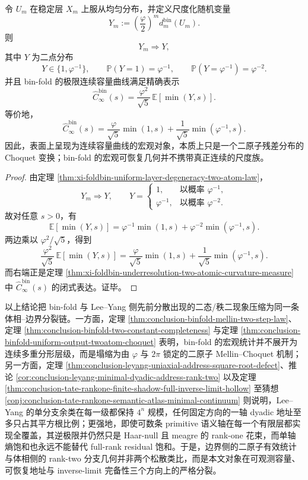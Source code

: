 \begin{theorem}\label{thm:conclusion-binfold-uniform-output-twoatom-choquet}
令 \(U_m\) 在稳定层 \(X_m\) 上服从均匀分布，并定义尺度化随机变量
\[
Y_m:=
\left(\frac{\varphi}{2}\right)^m d_m^{\mathrm{bin}}(U_m).
\]
则
\[
Y_m\Rightarrow Y,
\]
其中 \(Y\) 为二点分布
\[
Y\in\{1,\varphi^{-1}\},
\qquad
\mathbb P(Y=1)=\varphi^{-1},
\qquad
\mathbb P(Y=\varphi^{-1})=\varphi^{-2}.
\]
并且 bin-fold 的极限连续容量曲线满足精确表示
\[
\widehat C_\infty^{\mathrm{bin}}(s)
=
\frac{\varphi^2}{\sqrt5}\,\mathbb E[\min(Y,s)].
\]
等价地，
\[
\widehat C_\infty^{\mathrm{bin}}(s)
=
\frac{\varphi}{\sqrt5}\min(1,s)
+
\frac{1}{\sqrt5}\min(\varphi^{-1},s).
\]
因此，表面上呈现为连续容量曲线的宏观对象，本质上只是一个二原子残差分布的 Choquet 变换；bin-fold 的宏观可恢复几何并不携带真正连续的尺度族。
\end{theorem}
\begin{proof}
由定理 \ref{thm:xi-foldbin-uniform-layer-degeneracy-two-atom-law}，
\[
Y_m\Rightarrow Y,
\qquad
Y=
\begin{cases}
1,& \text{以概率 }\varphi^{-1},\\[4pt]
\varphi^{-1},& \text{以概率 }\varphi^{-2}.
\end{cases}
\]
故对任意 \(s>0\)，有
\[
\mathbb E[\min(Y,s)]
=
\varphi^{-1}\min(1,s)
+
\varphi^{-2}\min(\varphi^{-1},s).
\]
两边乘以 \(\varphi^2/\sqrt5\)，得到
\[
\frac{\varphi^2}{\sqrt5}\,\mathbb E[\min(Y,s)]
=
\frac{\varphi}{\sqrt5}\min(1,s)
+
\frac{1}{\sqrt5}\min(\varphi^{-1},s).
\]
而右端正是定理 \ref{thm:xi-foldbin-underresolution-two-atomic-curvature-measure} 中
\(
\widehat C_\infty^{\mathrm{bin}}(s)
\)
的闭式表达。证毕。
\end{proof}



\noindent
以上结论把 bin-fold 与 Lee--Yang 侧先前分散出现的二态/秩二现象压缩为同一条体相--边界分裂链。一方面，定理 \ref{thm:conclusion-binfold-mellin-two-step-law}、定理 \ref{thm:conclusion-binfold-two-constant-completeness} 与定理 \ref{thm:conclusion-binfold-uniform-output-twoatom-choquet} 表明，bin-fold 的宏观统计并不展开为连续多重分形层级，而是塌缩为由 \(\varphi\) 与 \(2\pi\) 锁定的二原子 Mellin--Choquet 机制；另一方面，定理 \ref{thm:conclusion-leyang-uniaxial-address-square-root-defect}、推论 \ref{cor:conclusion-leyang-minimal-dyadic-address-rank-two} 以及定理 \ref{thm:conclusion-tate-rankone-finite-shadow-full-inverse-limit-hollow} 至猜想 \ref{conj:conclusion-tate-rankone-semantic-atlas-minimal-continuum} 则说明，Lee--Yang 的单分支余类在每一级都保持 \(4^n\) 规模，任何固定方向的一轴 dyadic 地址至多只占其平方根比例；更强地，即使可数条 primitive 语义轴在每一个有限层都实现全覆盖，其逆极限并仍然只是 Haar-null 且 meagre 的 rank-one 花束，而单轴熵饱和也永远不能替代 full-rank residual 饱和。于是，边界侧的二原子有效统计与体相侧的 rank-two 分支几何并非两个松散类比，而是本文对象在可观测容量、可恢复地址与 inverse-limit 完备性三个方向上的严格分裂。

\endinput
